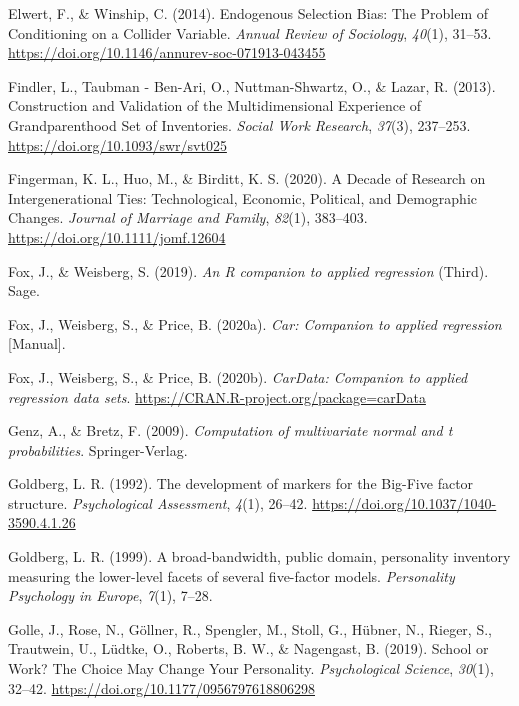 \documentclass[
  english,
  man,floatsintext]{apa7}
\begin{document}
\leavevmode\hypertarget{ref-elwertEndogenousSelectionBias2014}{}%
Elwert, F., \& Winship, C. (2014). Endogenous Selection Bias: The Problem of Conditioning on a Collider Variable. \emph{Annual Review of Sociology}, \emph{40}(1), 31--53. \url{https://doi.org/10.1146/annurev-soc-071913-043455}

\leavevmode\hypertarget{ref-findlerConstructionValidationMultidimensional2013}{}%
Findler, L., Taubman - Ben-Ari, O., Nuttman-Shwartz, O., \& Lazar, R. (2013). Construction and Validation of the Multidimensional Experience of Grandparenthood Set of Inventories. \emph{Social Work Research}, \emph{37}(3), 237--253. \url{https://doi.org/10.1093/swr/svt025}

\leavevmode\hypertarget{ref-fingermanDecadeResearchIntergenerational2020}{}%
Fingerman, K. L., Huo, M., \& Birditt, K. S. (2020). A Decade of Research on Intergenerational Ties: Technological, Economic, Political, and Demographic Changes. \emph{Journal of Marriage and Family}, \emph{82}(1), 383--403. \url{https://doi.org/10.1111/jomf.12604}

\leavevmode\hypertarget{ref-car2019}{}%
Fox, J., \& Weisberg, S. (2019). \emph{An R companion to applied regression} (Third). Sage.

\leavevmode\hypertarget{ref-R-car}{}%
Fox, J., Weisberg, S., \& Price, B. (2020a). \emph{Car: Companion to applied regression} {[}Manual{]}.

\leavevmode\hypertarget{ref-R-carData}{}%
Fox, J., Weisberg, S., \& Price, B. (2020b). \emph{CarData: Companion to applied regression data sets}. \url{https://CRAN.R-project.org/package=carData}

\leavevmode\hypertarget{ref-R-mvtnorm}{}%
Genz, A., \& Bretz, F. (2009). \emph{Computation of multivariate normal and t probabilities}. Springer-Verlag.

\leavevmode\hypertarget{ref-goldbergDevelopmentMarkersBigFive1992}{}%
Goldberg, L. R. (1992). The development of markers for the Big-Five factor structure. \emph{Psychological Assessment}, \emph{4}(1), 26--42. \url{https://doi.org/10.1037/1040-3590.4.1.26}

\leavevmode\hypertarget{ref-goldbergBroadbandwidthPublicDomain1999}{}%
Goldberg, L. R. (1999). A broad-bandwidth, public domain, personality inventory measuring the lower-level facets of several five-factor models. \emph{Personality Psychology in Europe}, \emph{7}(1), 7--28.

\leavevmode\hypertarget{ref-golleSchoolWorkChoice2019}{}%
Golle, J., Rose, N., Göllner, R., Spengler, M., Stoll, G., Hübner, N., Rieger, S., Trautwein, U., Lüdtke, O., Roberts, B. W., \& Nagengast, B. (2019). School or Work? The Choice May Change Your Personality. \emph{Psychological Science}, \emph{30}(1), 32--42. \url{https://doi.org/10.1177/0956797618806298}
\end{document}
